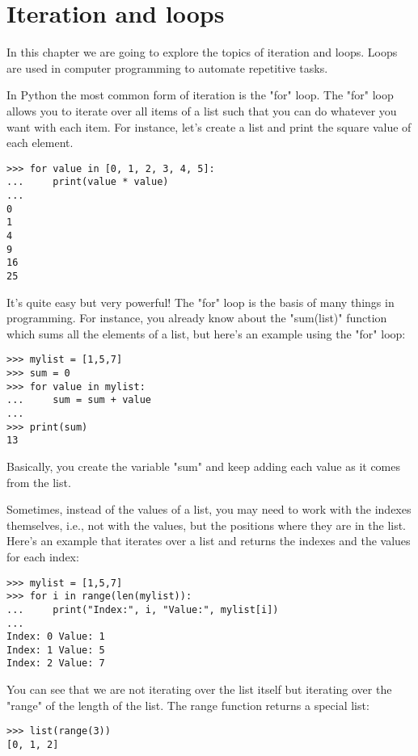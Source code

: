 \chapter{Iteration and loops}\label{loops}

In this chapter we are going to explore the topics of iteration and loops. Loops are used in computer programming to automate repetitive tasks. 

In Python the most common form of iteration is the "for" loop. The "for" loop allows you to iterate over all items of a list such that you can do whatever you want with each item. For instance, let's create a list and print the square value of each element.

\begin{lstlisting}
>>> for value in [0, 1, 2, 3, 4, 5]:
...     print(value * value)
... 
0
1
4
9
16
25
\end{lstlisting}

It's quite easy but very powerful! The "for" loop is the basis of many things in programming. For instance, you already know about the "sum(list)" function which sums all the elements of a list, but here's an example using the "for" loop:

\begin{lstlisting}
>>> mylist = [1,5,7]
>>> sum = 0
>>> for value in mylist:
...     sum = sum + value
... 
>>> print(sum)
13
\end{lstlisting}

Basically, you create the variable "sum" and keep adding each value as it comes from the list. 

Sometimes, instead of the values of a list, you may need to work with the indexes themselves, i.e., not with the values, but the positions where they are in the list. Here's an example that iterates over a list and returns the indexes and the values for each index:

\begin{lstlisting}
>>> mylist = [1,5,7]
>>> for i in range(len(mylist)):
...     print("Index:", i, "Value:", mylist[i])
... 
Index: 0 Value: 1
Index: 1 Value: 5
Index: 2 Value: 7
\end{lstlisting}

You can see that we are not iterating over the list itself but iterating over the "range" of the length of the list. The range function returns a special list:

\begin{lstlisting}
>>> list(range(3))
[0, 1, 2]
\end{lstlisting}

